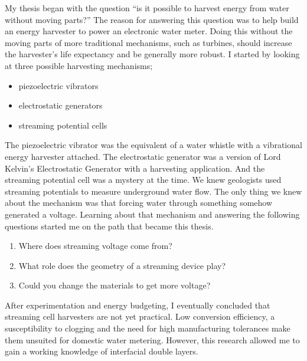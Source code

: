   My thesis began with the question ``is it possible to harvest energy from water without moving parts?''
  The reason for answering this question was to help build an energy harvester to power an electronic water meter.
  Doing this without the moving parts of more traditional mechanisms, such as turbines, should increase the harvester's life expectancy and be generally more robust.
  I started by looking at three possible harvesting mechanisms;
  \begin{itemize}
    \item piezoelectric vibrators
    \item electrostatic generators
    \item streaming potential cells
  \end{itemize}
  The piezoelectric vibrator was the equivalent of a water whistle with a vibrational energy harvester attached.
  The electrostatic generator was a version of Lord Kelvin's Electrostatic Generator with a harvesting application.
  And the streaming potential cell was a mystery at the time.
  We knew geologists used streaming potentials to measure underground water flow.
  The only thing we knew about the mechanism was that forcing water through something somehow generated a voltage.
  Learning about that mechanism and answering the following questions started me on the path that became this thesis.
  \begin{enumerate}
    \item Where does streaming voltage come from?
    \item What role does the geometry of a streaming device play?
    \item Could you change the materials to get more voltage?
  \end{enumerate}
  After experimentation and energy budgeting, I eventually concluded that streaming cell harvesters are not yet practical.
  Low conversion efficiency, a susceptibility to clogging and the need for high manufacturing tolerances make them unsuited for domestic water metering.
  However, this research allowed me to gain  a working knowledge of interfacial double layers.

